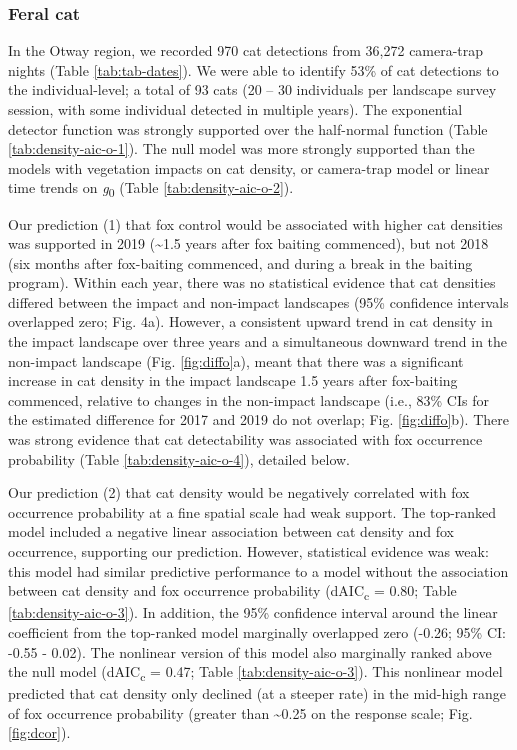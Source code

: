 \documentclass[preprint, 3p, authoryear]{elsarticle} %
\begin{document}
\hypertarget{feral-cat-1}{%
\subsubsection{Feral cat}\label{feral-cat-1}}

In the Otway region, we recorded 970 cat detections from 36,272 camera-trap nights (Table \ref{tab:tab-dates}). We were able to identify 53\% of cat detections to the individual-level; a total of 93 cats (20 -- 30 individuals per landscape survey session, with some individual detected in multiple years). The exponential detector function was strongly supported over the half-normal function (Table \ref{tab:density-aic-o-1}). The null model was more strongly supported than the models with vegetation impacts on cat density, or camera-trap model or linear time trends on \emph{g}\textsubscript{0} (Table \ref{tab:density-aic-o-2}).

Our prediction (1) that fox control would be associated with higher cat densities was supported in 2019 (\textasciitilde1.5 years after fox baiting commenced), but not 2018 (six months after fox-baiting commenced, and during a break in the baiting program). Within each year, there was no statistical evidence that cat densities differed between the impact and non-impact landscapes (95\% confidence intervals overlapped zero; Fig. 4a). However, a consistent upward trend in cat density in the impact landscape over three years and a simultaneous downward trend in the non-impact landscape (Fig. \ref{fig:diffo}a), meant that there was a significant increase in cat density in the impact landscape 1.5 years after fox-baiting commenced, relative to changes in the non-impact landscape (i.e., 83\% CIs for the estimated difference for 2017 and 2019 do not overlap; Fig. \ref{fig:diffo}b). There was strong evidence that cat detectability was associated with fox occurrence probability (Table \ref{tab:density-aic-o-4}), detailed below.

Our prediction (2) that cat density would be negatively correlated with fox occurrence probability at a fine spatial scale had weak support. The top-ranked model included a negative linear association between cat density and fox occurrence, supporting our prediction. However, statistical evidence was weak: this model had similar predictive performance to a model without the association between cat density and fox occurrence probability (dAIC\textsubscript{c} = 0.80; Table \ref{tab:density-aic-o-3}). In addition, the 95\% confidence interval around the linear coefficient from the top-ranked model marginally overlapped zero (-0.26; 95\% CI: -0.55 - 0.02). The nonlinear version of this model also marginally ranked above the null model (dAIC\textsubscript{c} = 0.47; Table \ref{tab:density-aic-o-3}). This nonlinear model predicted that cat density only declined (at a steeper rate) in the mid-high range of fox occurrence probability (greater than \textasciitilde0.25 on the response scale; Fig. \ref{fig:dcor}).
\end{document}

